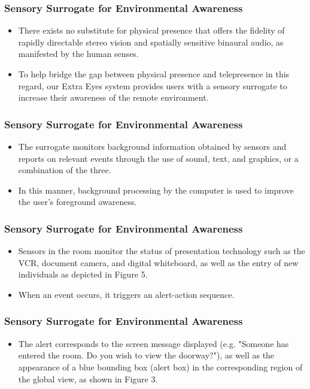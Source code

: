 \documentclass{beamer}
\begin{document}
\begin{frame}
\frametitle{Sensory Surrogate for Environmental Awareness}

\begin{itemize}
\item There exists no substitute for physical presence that offers the fidelity of rapidly directable stereo vision and spatially sensitive binaural audio, as manifested by the human senses.
\item To help bridge the gap between physical presence and telepresence in this regard, our Extra Eyes system provides users with a sensory surrogate to increase their awareness of the remote environment.
\end{itemize}

\end{frame}

\begin{frame}
\frametitle{Sensory Surrogate for Environmental Awareness}

\begin{itemize}
\item The surrogate monitors background information obtained by sensors and reports on relevant events through the use of sound, text, and graphics, or a combination of the three.
\item In this manner, background processing by the computer is used to improve the user's foreground awareness.
\end{itemize}

\end{frame}

\begin{frame}
\frametitle{Sensory Surrogate for Environmental Awareness}

\begin{itemize}
\item Sensors in the room  monitor the status of presentation technology such as the VCR, document camera, and digital whiteboard, as well as the entry of new individuals as depicted in Figure 5.
\item When an event occurs, it triggers an alert-action sequence.
\end{itemize}

\end{frame}

\begin{frame}
\frametitle{Sensory Surrogate for Environmental Awareness}

\begin{itemize}
\item The alert corresponds to the screen message displayed (e.g. "Someone has entered the room. Do you wish to view the doorway?"), as well as the appearance of a blue bounding box (alert box) in the corresponding region of the global view, as shown in Figure 3.
\end{itemize}

\end{frame}
\end{document}
